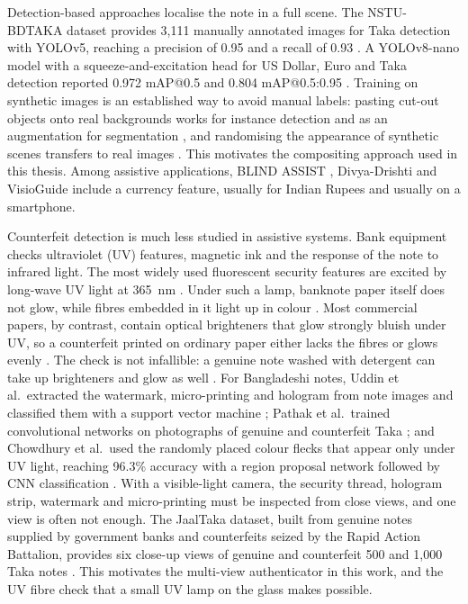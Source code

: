Detection-based approaches localise the note in a full scene. The NSTU-BDTAKA dataset provides 3,111 manually annotated images for Taka detection with YOLOv5, reaching a precision of 0.95 and a recall of 0.93 \cite{nstubdtaka2024}. A YOLOv8-nano model with a squeeze-and-excitation head for US Dollar, Euro and Taka detection reported 0.972 mAP@0.5 and 0.804 mAP@0.5:0.95 \cite{yolov8nse}. Training on synthetic images is an established way to avoid manual labels: pasting cut-out objects onto real backgrounds works for instance detection \cite{cutpaste2017} and as an augmentation for segmentation \cite{copypaste2021}, and randomising the appearance of synthetic scenes transfers to real images \cite{tobin2017domain, domainrand}. This motivates the compositing approach used in this thesis. Among assistive applications, BLIND ASSIST \cite{blindassist2021}, Divya-Drishti \cite{divyadrishti2021} and VisioGuide \cite{visioguide2025} include a currency feature, usually for Indian Rupees and usually on a smartphone.

Counterfeit detection is much less studied in assistive systems. Bank equipment checks ultraviolet (UV) features, magnetic ink and the response of the note to infrared light. The most widely used fluorescent security features are excited by long-wave UV light at 365~nm \cite{mutanen2003luminescent}. Under such a lamp, banknote paper itself does not glow, while fibres embedded in it light up in colour \cite{ecb2010quickguide,mutanen2003luminescent}. Most commercial papers, by contrast, contain optical brighteners that glow strongly bluish under UV, so a counterfeit printed on ordinary paper either lacks the fibres or glows evenly \cite{mutanen2003luminescent,thierauf2005patent}. The check is not infallible: a genuine note washed with detergent can take up brighteners and glow as well \cite{mutanen2003luminescent}. For Bangladeshi notes, Uddin et al.\ extracted the watermark, micro-printing and hologram from note images and classified them with a support vector machine \cite{uddin2016counterfeit}; Pathak et al.\ trained convolutional networks on photographs of genuine and counterfeit Taka \cite{pathak2024counterfeit}; and Chowdhury et al.\ used the randomly placed colour flecks that appear only under UV light, reaching 96.3\% accuracy with a region proposal network followed by CNN classification \cite{chowdhury2022uvink}. With a visible-light camera, the security thread, hologram strip, watermark and micro-printing must be inspected from close views, and one view is often not enough. The JaalTaka dataset, built from genuine notes supplied by government banks and counterfeits seized by the Rapid Action Battalion, provides six close-up views of genuine and counterfeit 500 and 1,000 Taka notes \cite{jaaltaka,piyas2026jaaltaka}. This motivates the multi-view authenticator in this work, and the UV fibre check that a small UV lamp on the glass makes possible.

